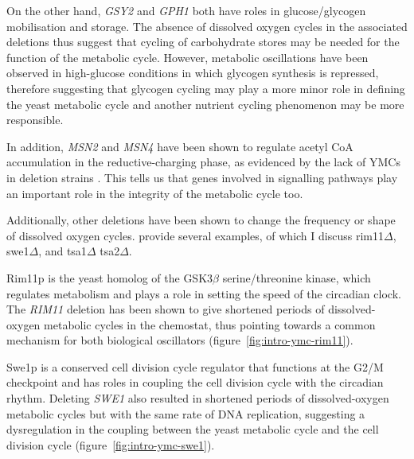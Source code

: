 On the other hand, \emph{GSY2} and \emph{GPH1} both have roles in glucose/glycogen mobilisation and storage.
The absence of dissolved oxygen cycles in the associated deletions thus suggest that cycling of carbohydrate stores may be needed for the function of the metabolic cycle.
However, metabolic oscillations have been observed in high-glucose conditions \parencite{papagiannakisAutonomousMetabolicOscillations2017, baumgartnerFlavinbasedMetabolicCycles2018} in which glycogen synthesis is repressed, therefore suggesting that glycogen cycling may play a more minor role in defining the yeast metabolic cycle and another nutrient cycling phenomenon may be more responsible.

In addition, \emph{MSN2} and \emph{MSN4} have been shown to regulate acetyl CoA accumulation in the reductive-charging phase, as evidenced by the lack of YMCs in deletion strains \parencite{kuangMsn2RegulateExpression2017}.
This tells us that genes involved in signalling pathways play an important role in the integrity of the metabolic cycle too.

Additionally, other deletions have been shown to change the frequency or shape of dissolved oxygen cycles.
\textcite{caustonMetabolicCyclesYeast2015} provide several examples, of which I discuss rim11$\Delta$, swe1$\Delta$, and tsa1$\Delta$ tsa2$\Delta$. %

Rim11p is the yeast homolog of the GSK3$\beta$ serine/threonine kinase, which regulates metabolism and plays a role in setting the speed of the circadian clock.
The \emph{RIM11} deletion has been shown to give shortened periods of dissolved-oxygen metabolic cycles in the chemostat, thus pointing towards a common mechanism for both biological oscillators (figure~\ref{fig:intro-ymc-rim11}).

Swe1p is a conserved cell division cycle regulator that functions at the G2/M checkpoint and has roles in coupling the cell division cycle with the circadian rhythm.
Deleting \emph{SWE1} also resulted in shortened periods of dissolved-oxygen metabolic cycles but with the same rate of DNA replication, suggesting a dysregulation in the coupling between the yeast metabolic cycle and the cell division cycle (figure~\ref{fig:intro-ymc-swe1}).

